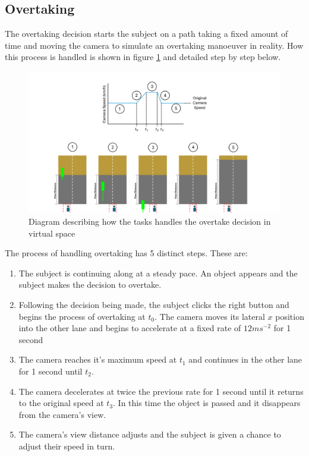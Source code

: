 \subsection{Overtaking}
The overtaking decision starts the subject on a path taking a fixed amount of time and moving the camera to simulate an overtaking manoeuver in reality. How this process is handled is shown in figure \ref{fig:MET_Over} and detailed step by step below.

\begin{figure}[H]
    \centering
    \includegraphics[width=\linewidth]{figures/Methods_Overtake.png}
    \caption{Diagram describing how the tasks handles the overtake decision in virtual space}
    \label{fig:MET_Over}
\end{figure}

The process of handling overtaking has 5 distinct steps. These are:
\begin{enumerate}
    \item The subject is continuing along at a steady pace. An object appears and the subject makes the decision to overtake.
    \item Following the decision being made, the subject clicks the right button and begins the process of overtaking at $t_{0}$. The camera moves its lateral $x$ position into the other lane and begins to accelerate at a fixed rate of $12 ms^{-2}$ for 1 second
    \item The camera reaches it's maximum speed at $t_{1}$ and continues in the other lane for 1 second until $t_{2}$.
    \item The camera decelerates at twice the previous rate for 1 second until it returns to the original speed at $t_{3}$. In this time the object is passed and it disappears from the camera's view.
    \item The camera's view distance adjusts and the subject is given a chance to adjust their speed in turn.
\end{enumerate}

